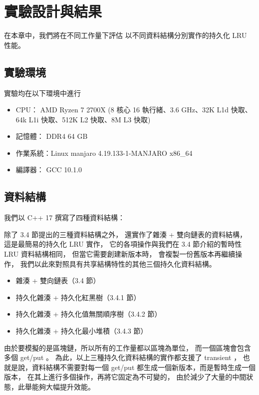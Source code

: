 \chapter{實驗設計與結果}
\label{c:experiment}

在本章中，我們將在不同工作量下評估
以不同資料結構分別實作的持久化 LRU 性能。

\section{實驗環境}
實驗均在以下環境中進行

\begin{itemize}
\item CPU： AMD Ryzen 7 2700X (8 核心 16 執行緒、3.6 GHz、32K L1d 快取、64k L1i 快取、512K L2 快取、8M L3 快取)
\item 記憶體： DDR4 64 GB
\item 作業系統：Linux manjaro 4.19.133-1-MANJARO x86\_64
\item 編譯器： GCC 10.1.0
\end{itemize}

\section{資料結構}

我們以 C++ 17 撰寫了四種資料結構：

除了 3.4 節提出的三種資料結構之外，
還實作了雜湊 + 雙向鏈表的資料結構，
這是最簡易的持久化 LRU 實作，
它的各項操作與我們在 3.4 節介紹的暫時性 LRU 資料結構相同，
但當它需要創建新版本時，
會複製一份舊版本再繼續操作，
我們以此來對照具有共享結構特性的其他三個持久化資料結構。

\begin{itemize}
\item 雜湊 + 雙向鏈表（3.4 節）
\item 持久化雜湊 + 持久化紅黑樹（3.4.1 節）
\item 持久化雜湊 + 持久化值無關順序樹（3.4.2 節）
\item 持久化雜湊 + 持久化最小堆積（3.4.3 節）
\end{itemize}

由於要模擬的是區塊鏈，所以所有的工作量都以區塊為單位，
而一個區塊會包含多個 get/put 。
為此，以上三種持久化資料結構的實作都支援了 transient \cite{puente2017persistence}，
也就是說，資料結構不需要對每一個 get/put 都生成一個新版本，而是暫時生成一個版本，
在其上進行多個操作，再將它固定為不可變的，
由於減少了大量的中間狀態，此舉能夠大幅提升效能。

